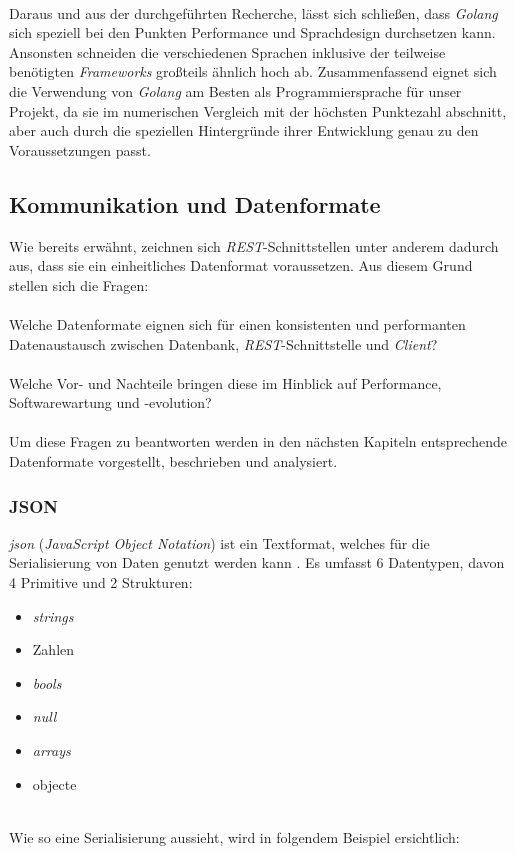 		~\\
		Daraus und aus der durchgeführten Recherche, lässt sich schließen, dass \textit{Golang} sich speziell bei den Punkten Performance und Sprachdesign durchsetzen kann. Ansonsten schneiden die verschiedenen Sprachen inklusive der teilweise benötigten \textit{Frameworks} großteils ähnlich hoch ab. Zusammenfassend eignet sich die Verwendung von \textit{Golang} am Besten als Programmiersprache für unser Projekt, da sie im numerischen Vergleich mit der höchsten Punktezahl abschnitt, aber auch durch die speziellen Hintergründe ihrer Entwicklung genau zu den Voraussetzungen passt.
	\subsection{Kommunikation und Datenformate}
	Wie bereits erwähnt, zeichnen sich \textit{REST}-Schnittstellen unter anderem dadurch aus, dass sie ein einheitliches Datenformat voraussetzen. Aus diesem Grund stellen sich die Fragen: \\~\\
	Welche Datenformate eignen sich für einen konsistenten und performanten Datenaustausch zwischen Datenbank, \textit{REST}-Schnittstelle und \textit{Client}? \\~\\
	Welche Vor- und Nachteile bringen diese im Hinblick auf Performance, Softwarewartung und -evolution?\\~\\
	Um diese Fragen zu beantworten werden in den nächsten Kapiteln entsprechende Datenformate vorgestellt, beschrieben und analysiert.
	
	\newpage
		\label{sec:json}
		\subsubsection{JSON}
		\textit{\Gls{json}} (\textit{JavaScript Object Notation}) ist ein Textformat, welches für die Serialisierung von Daten genutzt werden kann \cite{rfc4627}. 
		Es umfasst 6 Datentypen, davon 4 Primitive und 2 Strukturen:
		\begin{itemize}
			\item \textit{\Gls{string}s}
			\item Zahlen
			\item \textit{\Gls{bool}s}
			\item \textit{\Gls{null}}
			\item \textit{\Gls{array}s}
			\item \Gls{object}e
		\end{itemize}
		\label{code:jsontypes}~\\	
		Wie so eine Serialisierung aussieht, wird in folgendem Beispiel ersichtlich: 
		
